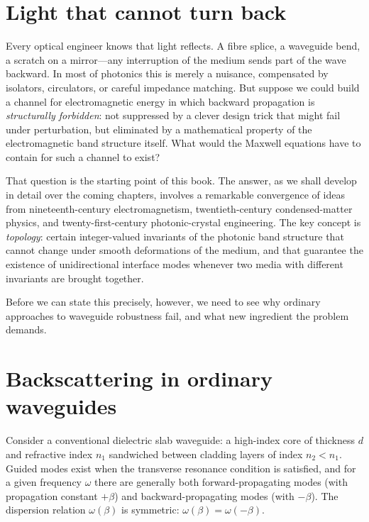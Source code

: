 
\section{Light that cannot turn back}
\label{sec:ch1-cannot-turn-back}

Every optical engineer knows that light reflects.  A fibre splice, a
waveguide bend, a scratch on a mirror---any interruption of the medium
sends part of the wave backward.  In most of photonics this is merely a
nuisance, compensated by isolators, circulators, or careful impedance
matching.  But suppose we could build a channel for electromagnetic
energy in which backward propagation is \emph{structurally forbidden}:
not suppressed by a clever design trick that might fail under
perturbation, but eliminated by a mathematical property of the
electromagnetic band structure itself.  What would the Maxwell equations
have to contain for such a channel to exist?

That question is the starting point of this book.  The answer, as we
shall develop in detail over the coming chapters, involves a remarkable
convergence of ideas from nineteenth-century electromagnetism,
twentieth-century condensed-matter physics, and twenty-first-century
photonic-crystal engineering.  The key concept is \emph{topology}:
certain integer-valued invariants of the photonic band structure that
cannot change under smooth deformations of the medium, and that
guarantee the existence of unidirectional interface modes whenever two
media with different invariants are brought together.

Before we can state this precisely, however, we need to see why ordinary
approaches to waveguide robustness fail, and what new ingredient the
problem demands.

\section{Backscattering in ordinary waveguides}
\label{sec:ch1-backscattering}

Consider a conventional dielectric slab waveguide: a high-index core of
thickness $d$ and refractive index $n_1$ sandwiched between cladding
layers of index $n_2 < n_1$.  Guided modes exist when the transverse
resonance condition is satisfied, and for a given frequency $\omega$
there are generally both forward-propagating modes (with propagation
constant $+\beta$) and backward-propagating modes (with $-\beta$).
The dispersion relation $\omega(\beta)$ is symmetric:
$\omega(\beta)=\omega(-\beta)$.

